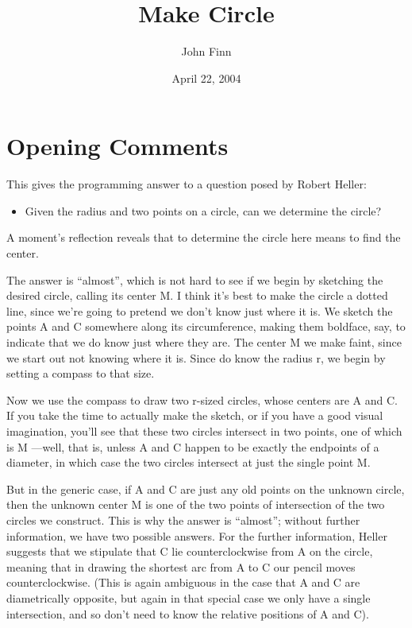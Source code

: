 \documentclass[12pt]{article}
\author{John Finn}
\date{April 22, 2004}
\title{Make Circle}
\begin{document}
\maketitle
\tableofcontents
\section{Opening Comments}

This gives the programming answer to a question posed by Robert Heller:

\begin{itemize}
\item Given the radius and two points on a circle, can we determine the circle?
\end{itemize}

A moment's reflection reveals that to determine the circle here means to find the center.
  
The answer is ``almost'', which is not hard to see if we begin by sketching the desired
circle, calling its center M.  I think it's best to make the circle a dotted line, since
we're going to pretend we don't know just where it is.  We sketch the points A and C 
somewhere along its circumference, making them boldface, say, to indicate that we do 
know just where they are.  The center M we make faint, since we start out not knowing
where it is.  Since do know the radius r, we begin by setting a compass to that size.

Now we use the compass to draw two r-sized circles, whose centers are A and C.  If
you take the time to actually make the sketch, or if you have a good visual imagination, 
you'll see that these two circles intersect in two points, one of which is M ---well, 
that is, unless A and C happen to be exactly the endpoints of a diameter, in 
which case the two circles intersect at just the single point M.

But in the generic case, if A and C are just any old points on the unknown circle, 
then the unknown center M is one of the two points of intersection of the two circles we
construct.  This is why the answer is ``almost'';  without further information, we have
two possible answers.  For the further information, Heller suggests that we stipulate 
that C lie counterclockwise from A on the circle, meaning that in drawing the shortest 
arc from A to C our pencil moves counterclockwise.  (This is again ambiguous in the case
that A and C are diametrically opposite, but again in that special case we only have a 
single intersection, and so don't need to know the relative positions of A and C).
\end{document}
